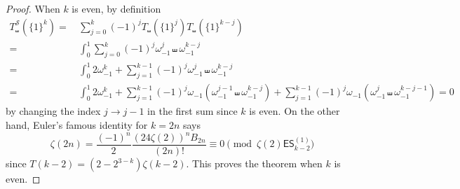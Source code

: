 \documentclass{article}
\newcommand{\ES}{\mathsf {ES}}
\newcommand{\sha}{\shuffle}
\newcommand{\Sy}{{\mathcal S}}
\newcommand\om{{\omega}}
\theoremstyle{plain}
\theoremstyle{definition}
\begin{document}
\begin{proof}
When $k$ is even, by definition
\begin{align*}
    T_\sha^\Sy(\{1\}^k)=&\,  \sum_{j=0}^k  (-1)^j T_\sha(\{1\}^j)T_\sha(\{1\}^{k-j})\\
=&\, \int_0^1 \sum_{j=0}^k  (-1)^j \om_{-1}^j\sha \om_{-1}^{k-j}\\
=&\, \int_0^1 2\om_{-1}^k+  \sum_{j=1}^{k-1}  (-1)^j \om_{-1}^j\sha \om_{-1}^{k-j}  \\
=&\, \int_0^1 2\om_{-1}^k+  \sum_{j=1}^{k-1}  (-1)^j \om_{-1}(\om_{-1}^{j-1}\sha \om_{-1}^{k-j})
+ \sum_{j=1}^{k-1}  (-1)^j \om_{-1}(\om_{-1}^j\sha \om_{-1}^{k-j-1}) =0
\end{align*}
by changing the index $j\to j-1$ in the first sum since $k$ is even. On the other hand, Euler's famous identity for $k=2n$ says
\begin{equation*}
\zeta(2n)=\frac{(-1)^n}{2} \frac{(24\zeta(2))^{n} B_{2n}}{(2n)!}\equiv 0   \pmod{\zeta(2)\ES_{k-2}^{(1)}}
\end{equation*}
since $T(k-2)=(2-2^{3-k}) \zeta(k-2)$. This proves the theorem when $k$ is even.


\end{proof}
\end{document}
